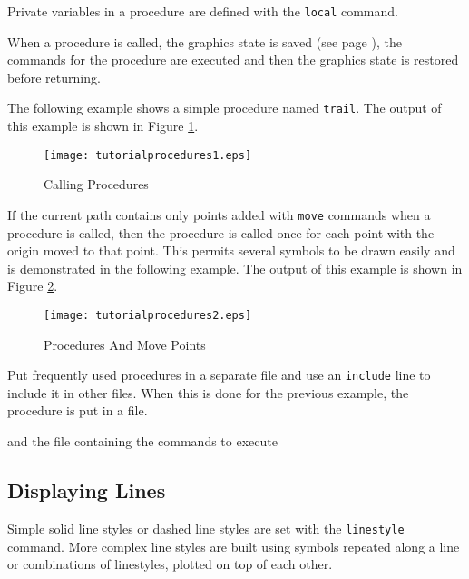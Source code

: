 Private variables in a procedure are defined with the 
\texttt{local} command.

When a procedure is called, the graphics state
is saved (see page \pageref{graphicsstate}),
the commands for the procedure are executed and then the
graphics state is restored before returning.

The following example shows a simple procedure named \texttt{trail}.
The output of this example is shown in Figure \ref{tutorialprocedures1}.



\begin{figure}[htb]
\texttt{[image: tutorialprocedures1.eps]}
\caption{Calling Procedures}
\label{tutorialprocedures1}
\end{figure}

If the current path contains only points added with \texttt{move}
commands when a procedure is called, then the
procedure is called once for each point with the origin
moved to that point.  This permits several symbols to be drawn
easily and is demonstrated in the following example.  The 
output of this example is shown in Figure \ref{tutorialprocedures2}.



\begin{figure}[htb]
\texttt{[image: tutorialprocedures2.eps]}
\caption{Procedures And Move Points}
\label{tutorialprocedures2}
\end{figure}


Put frequently used procedures in a separate file and use an
\texttt{include}
line to include it in other files.  When this is done for the
previous example, the procedure is put in a file.



and the file containing the commands to execute



\subsection{Displaying Lines}

Simple solid line styles or dashed line styles
are set with the
\texttt{linestyle} command.  More complex line styles are built using
symbols repeated along a line or combinations of linestyles, plotted
on top of each other.

